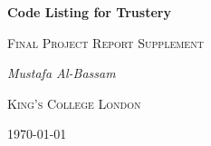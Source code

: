 \documentclass[12pt]{report}
\begin{document}
	\begin{titlepage}
		\centering
		{\huge\bfseries Code Listing for Trustery\par}
		\vspace{1cm}
		{\Large\scshape Final Project Report Supplement\par}
		\vspace{1.5cm}
		{\Large\itshape Mustafa Al-Bassam\par}
		\vfill
		{\LARGE\scshape King's College London\par}
		\vfill
		{\large \today\par}
	\end{titlepage}
\end{document}
